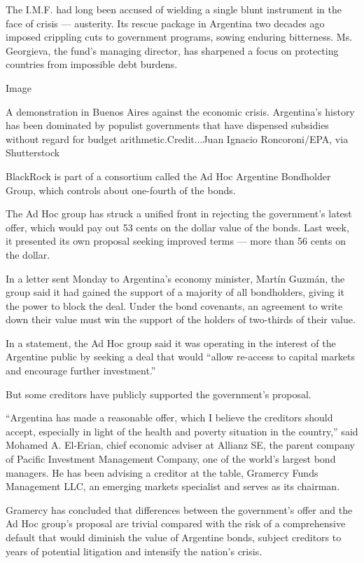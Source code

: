The I.M.F. had long been accused of wielding a single blunt instrument
in the face of crisis --- austerity. Its rescue package in Argentina two
decades ago imposed crippling cuts to government programs, sowing
enduring bitterness. Ms. Georgieva, the fund's managing director, has
sharpened a focus on protecting countries from impossible debt burdens.

Image

A demonstration in Buenos Aires against the economic crisis. Argentina's
history has been dominated by populist governments that have dispensed
subsidies without regard for budget arithmetic.Credit...Juan Ignacio
Roncoroni/EPA, via Shutterstock

BlackRock is part of a consortium called the Ad Hoc Argentine Bondholder
Group, which controls about one-fourth of the bonds.

The Ad Hoc group has struck a unified front in rejecting the
government's latest offer, which would pay out 53 cents on the dollar
value of the bonds. Last week, it presented its own proposal seeking
improved terms --- more than 56 cents on the dollar.

In a letter sent Monday to Argentina's economy minister, Martín Guzmán,
the group said it had gained the support of a majority of all
bondholders, giving it the power to block the deal. Under the bond
covenants, an agreement to write down their value must win the support
of the holders of two-thirds of their value.

In a statement, the Ad Hoc group said it was operating in the interest
of the Argentine public by seeking a deal that would ``allow re-access
to capital markets and encourage further investment.''

But some creditors have publicly supported the government's proposal.

``Argentina has made a reasonable offer, which I believe the creditors
should accept, especially in light of the health and poverty situation
in the country,'' said Mohamed A. El-Erian, chief economic adviser at
Allianz SE, the parent company of Pacific Investment Management Company,
one of the world's largest bond managers. He has been advising a
creditor at the table, Gramercy Funds Management LLC, an emerging
markets specialist and serves as its chairman.

Gramercy has concluded that differences between the government's offer
and the Ad Hoc group's proposal are trivial compared with the risk of a
comprehensive default that would diminish the value of Argentine bonds,
subject creditors to years of potential litigation and intensify the
nation's crisis.

